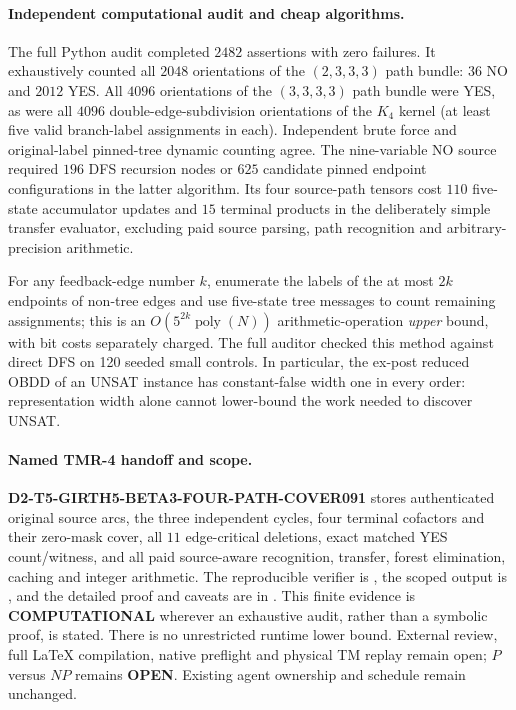 \documentclass[11pt]{article}
\begin{document}
\paragraph{Independent computational audit and cheap algorithms.}
The full Python audit completed $2482$ assertions with zero
failures. It exhaustively counted all $2048$ orientations of
the $(2,3,3,3)$ path bundle: $36$ NO and $2012$ YES.
All $4096$ orientations of the $(3,3,3,3)$ path bundle
were YES, as were all $4096$ double-edge-subdivision
orientations of the $K_4$ kernel (at least five valid
branch-label assignments in each). Independent brute
force and original-label pinned-tree dynamic counting
agree. The nine-variable NO source required $196$ DFS
recursion nodes or $625$ candidate pinned endpoint
configurations in the latter algorithm. Its four
source-path tensors cost $110$ five-state accumulator
updates and $15$ terminal products in the deliberately
simple transfer evaluator, excluding paid source parsing,
path recognition and arbitrary-precision arithmetic.

For any feedback-edge number $k$, enumerate the labels of
the at most $2k$ endpoints of non-tree edges and use
five-state tree messages to count remaining assignments;
this is an $O(5^{2k}\operatorname{poly}(N))$
arithmetic-operation \emph{upper} bound, with bit costs
separately charged. The full auditor checked this method
against direct DFS on 120 seeded small controls.
In particular, the ex-post reduced OBDD of an UNSAT
instance has constant-false width one in every order:
representation width alone cannot lower-bound the
work needed to discover UNSAT.

\paragraph{Named TMR-4 handoff and scope.}
\textbf{D2-T5-GIRTH5-BETA3-FOUR-PATH-COVER091}
stores authenticated original source arcs, the three
independent cycles, four terminal cofactors and their
zero-mask cover, all $11$ edge-critical deletions,
exact matched YES count/witness, and all paid source-aware
recognition, transfer, forest elimination, caching and
integer arithmetic. The reproducible verifier is
,
the scoped output is
,
and the detailed proof and caveats are in
.
This finite evidence is \textbf{COMPUTATIONAL} wherever
an exhaustive audit, rather than a symbolic proof,
is stated. There is no unrestricted runtime lower
bound. External review, full LaTeX compilation, native
preflight and physical TM replay remain open;
$P$ versus $NP$ remains \textbf{OPEN}.
Existing agent ownership and schedule remain unchanged.
\end{document}
